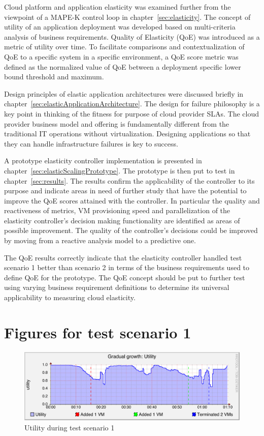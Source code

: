 \documentclass[english]{tktltiki2}
\theoremstyle{definition}
\theoremstyle{remark}
\begin{document}
Cloud platform and application elasticity was examined further from the
viewpoint of a MAPE-K control loop in chapter~\ref{sec:elasticity}. The concept
of utility of an application deployment was developed based on multi-criteria
analysis of business requirements. Quality of Elasticity (QoE) was introduced as
a metric of utility over time. To facilitate comparisons and contextualization
of QoE to a specific system in a specific environment, a QoE score metric was
defined as the normalized value of QoE between a deployment specific lower bound
threshold and maximum.

Design principles of elastic application architectures were discussed briefly in
chapter~\ref{sec:elasticApplicationArchitecture}. The design for failure
philosophy is a key point in thinking of the fitness for purpose of cloud
provider SLAs. The cloud provider business model and offering is fundamentally
different from the traditional IT operations without virtualization. Designing
applications so that they can handle infrastructure failures is key to success.

A prototype elasticity controller implementation  is presented in
chapter~\ref{sec:elasticScalingPrototype}. The prototype is then put to test in
chapter~\ref{sec:results}. The results confirm the applicability of the
controller to its purpose and indicate areas in need of further study that have
the potential to improve the QoE scores attained with the controller. In
particular the quality and reactiveness of metrics, VM provisioning speed and
parallelization of the elasticity controller's decision making functionality are
identified as areas of possible improvement. The quality of the controller's
decisions could be improved by moving from a reactive analysis model to a
predictive one.

The QoE results correctly indicate that the elasticity controller handled test
scenario 1 better than scenario 2 in terms of the business requirements used
to define QoE for the prototype. The QoE concept should be put to further test
using varying business requirement definitions to determine its universal
applicability to measuring cloud elasticity.

\clearpage
\appendix

\section{Figures for test scenario 1}

\begin{figure}[htbp]
	\includegraphics[width=\textwidth]{images/utilitygraph-test21}
	\caption{Utility during test scenario 1}
	\label{fig:utilityScenario1}
\end{figure}
\end{document}
